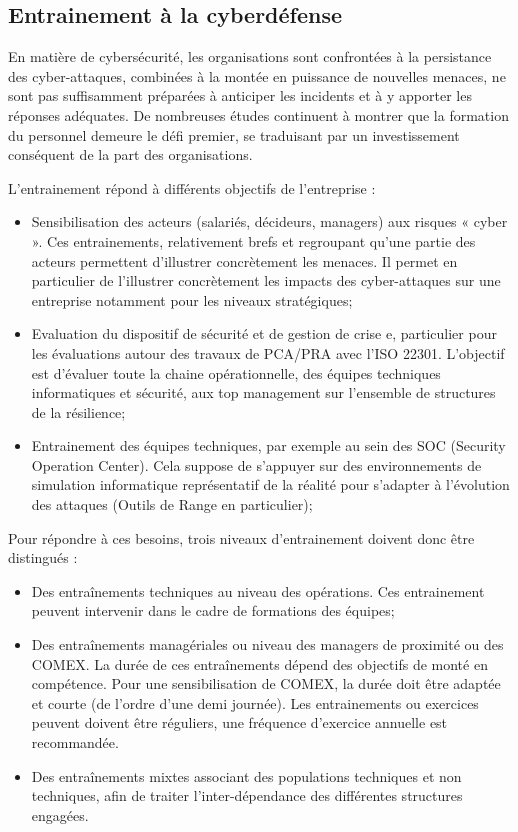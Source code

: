 \subsection{Entrainement à la cyberdéfense}

En matière de cybersécurité, les organisations sont confrontées à la persistance des cyber-attaques, combinées à la montée en puissance de nouvelles menaces, ne sont pas suffisamment préparées à anticiper les incidents et à y apporter les réponses adéquates. De nombreuses études continuent à montrer  que la formation du personnel demeure le défi premier, se traduisant par un investissement conséquent de la part des organisations.

L’entrainement répond à différents objectifs de l'entreprise  :
\begin{itemize}
  \item Sensibilisation des acteurs (salariés, décideurs, managers) aux risques « cyber ». Ces entrainements, relativement brefs et regroupant qu'une partie des acteurs  permettent d’illustrer concrètement les menaces. Il permet en particulier de l'illustrer concrètement les impacts des cyber-attaques sur une entreprise notamment pour les niveaux stratégiques;
  \item   Evaluation du dispositif de sécurité et de gestion de crise e, particulier pour les évaluations autour des travaux de PCA/PRA avec l'ISO 22301. L’objectif est d'évaluer toute la chaine opérationnelle, des équipes techniques informatiques et sécurité, aux top management sur l'ensemble de structures de la résilience;
  \item Entrainement des équipes techniques, par exemple au sein des SOC (Security Operation Center). Cela suppose de s’appuyer sur des environnements de simulation informatique représentatif de la réalité pour s'adapter à l'évolution des attaques (Outils de Range en particulier);
\end{itemize}


Pour répondre à ces besoins, trois niveaux d’entrainement doivent donc être distingués :

\begin{itemize}
  \item Des entraînements techniques au niveau des opérations. Ces entrainement peuvent intervenir dans le cadre de formations des équipes;
  \item Des entraînements managériales ou niveau des managers de proximité ou des COMEX. La durée de ces entraînements dépend des objectifs de monté en compétence. Pour une  sensibilisation de COMEX,  la durée doit être adaptée et courte (de l'ordre d'une demi journée). Les entrainements  ou exercices peuvent doivent être réguliers, une fréquence d'exercice annuelle est recommandée.
  \item Des entraînements mixtes associant des populations techniques et non techniques, afin de traiter l'inter-dépendance des différentes structures engagées.
\end{itemize}




